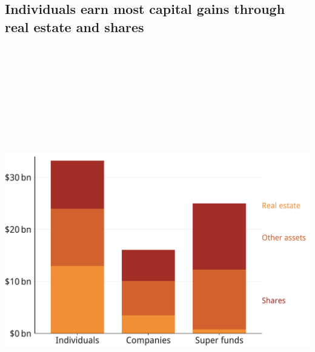 \documentclass[tikz]{standalone}\usepackage[]{graphicx}\usepackage[]{color}
\newenvironment{knitrout}{}{} %
\begin{document}
\subsection{Individuals earn most capital gains through real estate and shares}
\begin{knitrout}
\color{fgcolor}
\includegraphics[width=11.000in,height=7.00in]{./Hot-property-CG-and-NG/CGT-NG-atlas/b5-palatino-atlas/CGT-by-asset-1} 

\end{knitrout}
\end{document}
